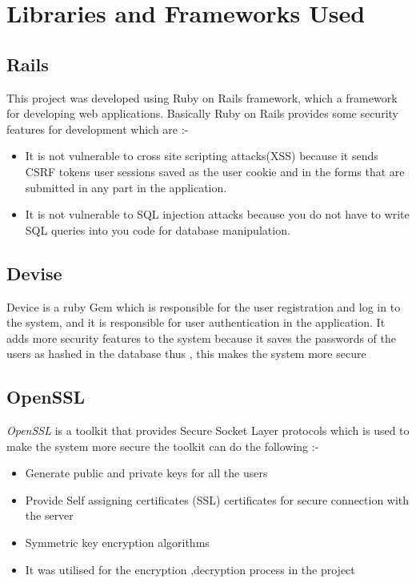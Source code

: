 \chapter{Libraries and Frameworks Used}

\section{Rails}
This project was developed using Ruby on Rails framework, which a framework for developing web applications. Basically Ruby on Rails provides some security features for development which are :-
\begin{itemize}
    \item It is not vulnerable to cross site scripting attacks(XSS) because it sends CSRF tokens user sessions saved as the user cookie and in the forms that are submitted in any part in the application.
    
    \item It is not vulnerable to SQL injection attacks because you do not have to write SQL queries into you code for database manipulation. 
\end{itemize}


\section{Devise}
Device is a ruby Gem which is responsible for the user registration and log in to the system, and it is responsible for user authentication in the application. It adds more security features to the system  because it saves the passwords of the users as hashed in the database thus , this makes the system more secure

\section{OpenSSL}

\textit{OpenSSL} is a toolkit that provides Secure Socket Layer protocols which is used to make the system more secure the toolkit can do the following :-
\begin{itemize}
    \item Generate public and private keys for all the users
    \item Provide Self assigning certificates (SSL) certificates for secure connection with the server
    \item Symmetric key encryption algorithms
    \item It was utilised for the encryption ,decryption process in the project
\end{itemize}

